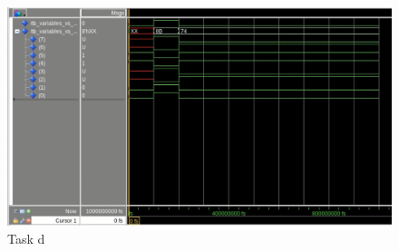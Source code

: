         \begin{figure}[!ht]
            \centering
            \includegraphics[width = \textwidth]{figur4.png}
            \caption{Task d}
            \label{fig:figure4}
        \end{figure}
